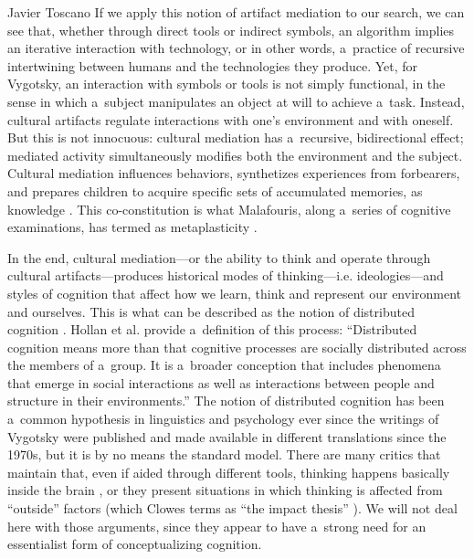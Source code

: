 \begin{artengenv}{Javier Toscano}
If we apply this notion of artifact mediation to our search, we can see that, whether through direct tools or indirect symbols, an algorithm implies an iterative interaction with technology, or in other words, a~practice of recursive intertwining between humans and the technologies they produce. Yet, for Vygotsky, an interaction with symbols or tools is not simply functional, in the sense in which a~subject manipulates an object at will to achieve a~task. Instead, cultural artifacts regulate interactions with one's environment and with oneself. But this is not innocuous: cultural mediation has a~recursive, bidirectional effect; mediated activity simultaneously modifies both the environment and the subject. Cultural mediation influences behaviors, synthetizes experiences from forbearers, and prepares children to acquire specific sets of accumulated memories, as knowledge
\parencite[see here also][]{connerton_how_1989}. %
 This co-constitution is what Malafouris, along a~series of cognitive examinations, has termed as metaplasticity 
\parencites[][]{malafouris_metaplasticity_2010}[][]{malafouris_how_2013}[][]{malafouris_metaplasticity_2015}.%


In the end, cultural mediation---or the ability to think and operate through cultural artifacts---produces historical modes of thinking---i.e. ideologies---and styles of cognition that affect how we learn, think and represent our environment and ourselves. This is what can be described as the notion of distributed cognition
\parencites[][]{salomon_cultural-historical_1993}[][]{gallagher_how_2005}[][]{gallagher_socially_2013}. %
 Hollan et al. 
\parencite*[][p.177]{laland_niche_2000} %
 provide a~definition of this process: ``Distributed cognition means more than that cognitive processes are socially distributed across the members of a~group. It is a~broader conception that includes phenomena that emerge in social interactions as well as interactions between people and structure in their environments.'' The notion of distributed cognition has been a~common hypothesis in linguistics and psychology ever since the writings of Vygotsky were published and made available in different translations since the 1970s, but it is by no means the standard model. There are many critics that maintain that, even if aided through different tools, thinking happens basically inside the brain 
\parencites[][]{adams_bounds_2008}[][]{menary_defending_2010}[][]{loh_how_2016}, %
 or they present situations in which thinking is affected from ``outside'' factors (which Clowes terms as ``the impact thesis'' 
\parencite[][]{clowes_screen_2019}%
). We will not deal here with those arguments, since they appear to have a~strong need for an essentialist form of conceptualizing cognition.


\end{artengenv}
